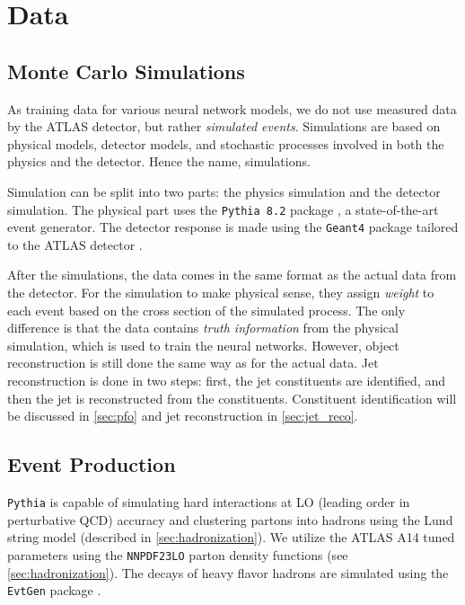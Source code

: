 \chapter{Data}

\section{Monte Carlo Simulations}
\label{sec:mc_simluation}
As training data for various neural network models, we do not use measured data by the ATLAS detector, but rather \emph{simulated events}. 
Simulations are based on physical models, detector models, and stochastic processes involved in both the physics and the detector.
Hence the name, \MC simulations.

Simulation can be split into two parts: the physics simulation and the detector simulation.
The physical part uses the \texttt{Pythia 8.2} package \cite{pythia}, a state-of-the-art event generator.
The detector response is made using the \texttt{Geant4} package \cite{geant4} tailored to the ATLAS detector \cite{atlas_sym}.

After the simulations, the \MC data comes in the same format as the actual data from the detector.
For the simulation to make physical sense, they assign \emph{weight} to each event based on the cross section of the simulated process.
The only difference is that the \MC data contains \emph{truth information} from the physical simulation, which is used to train the neural networks.
However, object reconstruction is still done the same way as for the actual data.
Jet reconstruction is done in two steps: first, the jet constituents are identified, and then the jet is reconstructed from the constituents. 
Constituent identification will be discussed in \cref{sec:pfo} and jet reconstruction in \cref{sec:jet_reco}.

\section{Event Production}
\label{sec:event_production}
\texttt{Pythia} is capable of simulating hard interactions at LO (leading order in perturbative QCD) accuracy and clustering partons into hadrons using the Lund string model (described in \cref{sec:hadronization}).
We utilize the ATLAS A14 tuned parameters \cite{atlas_A14_tunes} using the \texttt{NNPDF23LO} \cite{NNPDF23LO} parton density functions (see \cref{sec:hadronization}).
The decays of heavy flavor hadrons are simulated using the \texttt{EvtGen} package \cite{EvtGen}.

